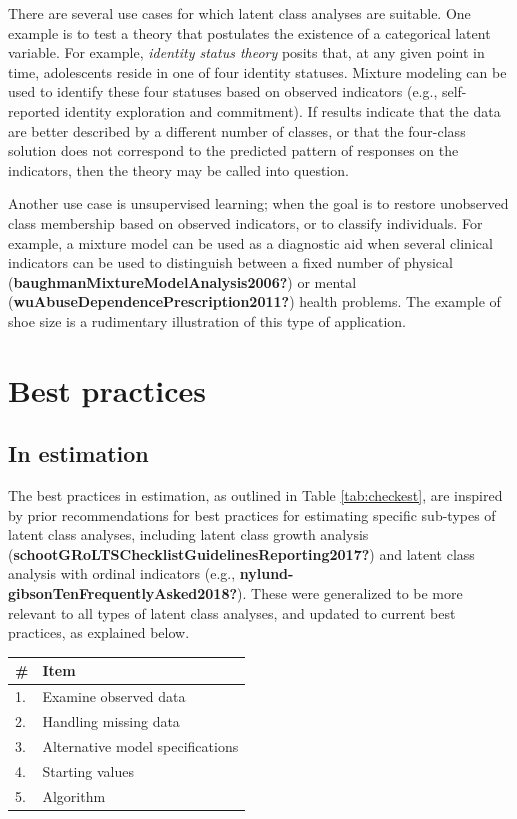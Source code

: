\documentclass[
  ,man]{apa6}
\begin{document}
There are several use cases for which latent class analyses are suitable.
One example is to test a theory that postulates the existence of a categorical latent variable.
For example, \emph{identity status theory} posits that, at any given point in time, adolescents reside in one of four identity statuses.
Mixture modeling can be used to identify these four statuses based on observed indicators (e.g., self-reported identity exploration and commitment).
If results indicate that the data are better described by a different number of classes,
or that the four-class solution does not correspond to the predicted pattern of responses on the indicators, then the theory may be called into question.

Another use case is unsupervised learning;
when the goal is to restore unobserved class membership based on observed indicators,
or to classify individuals.
For example, a mixture model can be used as a diagnostic aid when several clinical indicators can be used to distinguish between a fixed number of physical (\textbf{baughmanMixtureModelAnalysis2006?}) or mental (\textbf{wuAbuseDependencePrescription2011?}) health problems.
The example of shoe size is a rudimentary illustration of this type of application.

\hypertarget{best-practices}{%
\section{Best practices}\label{best-practices}}

\hypertarget{in-estimation}{%
\subsection{In estimation}\label{in-estimation}}

The best practices in estimation, as outlined in Table \ref{tab:checkest},
are inspired by prior recommendations for best practices for estimating
specific sub-types of latent class analyses,
including latent class growth analysis (\textbf{schootGRoLTSChecklistGuidelinesReporting2017?})
and latent class analysis with ordinal indicators (e.g., \textbf{nylund-gibsonTenFrequentlyAsked2018?}).
These were generalized to be more relevant to all types of latent class analyses,
and updated to current best practices, as explained below.

\begin{tabular}[t]{l|l}
\hline
\# & Item\\
\hline
1. & Examine observed data\\
\hline
2. & Handling missing data\\
\hline
3. & Alternative model specifications\\
\hline
4. & Starting values\\
\hline
5. & Algorithm\\
\hline
\end{tabular}
\end{document}
